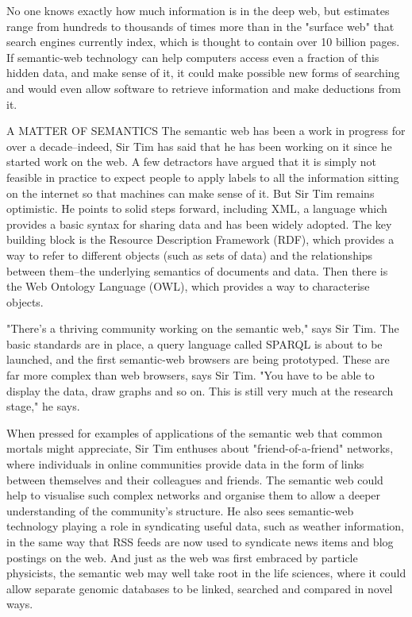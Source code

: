 No one knows exactly how much information is in the deep web, but estimates range from hundreds to thousands of times more than in the "surface web" that search engines currently index, which is thought to contain over 10 billion pages. If semantic-web technology can help computers access even a fraction of this hidden data, and make sense of it, it could make possible new forms of searching and would even allow software to retrieve information and make deductions from it.

A MATTER OF SEMANTICS
The semantic web has been a work in progress for over a decade--indeed, Sir Tim has said that he has been working on it since he started work on the web. A few detractors have argued that it is simply not feasible in practice to expect people to apply labels to all the information sitting on the internet so that machines can make sense of it. But Sir Tim remains optimistic. He points to solid steps forward, including XML, a language which provides a basic syntax for sharing data and has been widely adopted. The key building block is the Resource Description Framework (RDF), which provides a way to refer to different objects (such as sets of data) and the relationships between them--the underlying semantics of documents and data. Then there is the Web Ontology Language (OWL), which provides a way to characterise objects. 

"There's a thriving community working on the semantic web," says Sir Tim. The basic standards are in place, a query language called SPARQL is about to be launched, and the first semantic-web browsers are being prototyped. These are far more complex than web browsers, says Sir Tim. "You have to be able to display the data, draw graphs and so on. This is still very much at the research stage," he says.

When pressed for examples of applications of the semantic web that common mortals might appreciate, Sir Tim enthuses about "friend-of-a-friend" networks, where individuals in online communities provide data in the form of links between themselves and their colleagues and friends. The semantic web could help to visualise such
complex networks and organise them to allow a deeper understanding of the community's structure. He also sees semantic-web technology playing a role in syndicating useful data, such as weather information, in the same way that RSS feeds are now used to syndicate news items and blog postings on the web. And just as the web was first embraced by particle physicists, the semantic web may well take root in the life sciences, where it could allow separate genomic databases to be linked, searched and compared in novel ways.


